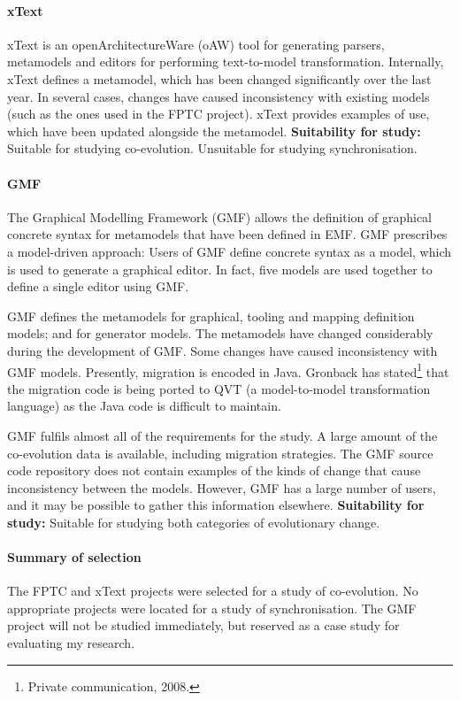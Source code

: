 \paragraph{xText} %
\label{par:xtext}
xText is an openArchitectureWare (oAW) \cite{oaw} tool for generating parsers, metamodels and editors for performing text-to-model transformation. Internally, xText defines a metamodel, which has been changed significantly over the last year. In several cases, changes have caused inconsistency with existing models (such as the ones used in the FPTC project). xText provides examples of use, which have been updated alongside the metamodel. \textbf{Suitability for study:} Suitable for studying co-evolution. Unsuitable for studying synchronisation.

\paragraph{GMF} %
\label{par:gmf}
The Graphical Modelling Framework (GMF) \cite{gronback06gmf} allows the definition of graphical concrete syntax for metamodels that have been defined in EMF. GMF prescribes a model-driven approach: Users of GMF define concrete syntax as a model, which is used to generate a graphical editor. In fact, five models are used together to define a single editor using GMF.

GMF defines the metamodels for graphical, tooling and mapping definition models; and for generator models. The metamodels have changed considerably during the development of GMF. Some changes have caused inconsistency with GMF models. Presently, migration is encoded in Java. Gronback has stated\footnote{Private communication, 2008.} that the migration code is being ported to QVT (a model-to-model transformation language) as the Java code is difficult to maintain.

GMF fulfils almost all of the requirements for the study. A large amount of the co-evolution data is available, including migration strategies. The GMF source code repository does not contain examples of the kinds of change that cause inconsistency between the models. However, GMF has a large number of users, and it may be possible to gather this information elsewhere. \textbf{Suitability for study:} Suitable for studying both categories of evolutionary change.

\paragraph{Summary of selection}
The FPTC and xText projects were selected for a study of co-evolution. No appropriate projects were located for a study of synchronisation. The GMF project will not be studied immediately, but reserved as a case study for evaluating my research.

